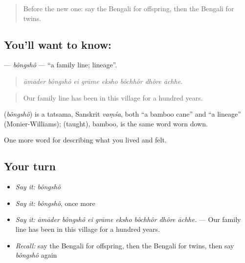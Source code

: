 \begin{quote}
Before the new one: say the Bengali for offspring, then the Bengali for twins.
\end{quote}

\subsection*{You'll want to know: }
\textbf{} — \emph{bôngshô} — \textquotedblleft{}a family line; lineage\textquotedblright{}.

\begin{quote}
       
\end{quote}

\begin{quote}
\emph{āmāder bôngshô ei grāme eksho bôchhôr dhôre āchhe.}
\end{quote}

\begin{quote}
Our family line has been in this village for a hundred years.
\end{quote}

\begin{cousinweb}
\textbf{} (\emph{bôngshô}) is a tatsama, Sanskrit \emph{vaṃśa}, both \textquotedblleft{}a bamboo cane\textquotedblright{} and \textquotedblleft{}a lineage\textquotedblright{} (Monier-Williams);  (taught), bamboo, is the same word worn down.
\end{cousinweb}

\begin{grammarlens}[title={What you've built}]
One more word for describing what you lived and felt.
\end{grammarlens}

\subsection*{Your turn}
\begin{itemize}
\raggedright
  \item \emph{Say it:} \emph{bôngshô}
  \item \emph{Say it:} \emph{bôngshô}, once more
  \item \emph{Say it:} \emph{āmāder bôngshô ei grāme eksho bôchhôr dhôre āchhe.} — Our family line has been in this village for a hundred years.
  \item \emph{Recall:} say the Bengali for offspring, then the Bengali for twins, then say \emph{bôngshô} again
\end{itemize}

